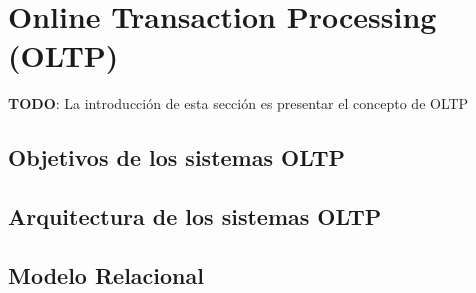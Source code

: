 \section{Online Transaction Processing (OLTP)} \label{section:oltp}

\textbf{TODO}: La introducci\'on de esta secci\'on es presentar el concepto de OLTP

\subsection{Objetivos de los sistemas OLTP}
\subsection{Arquitectura de los sistemas OLTP}
\subsection{Modelo Relacional}